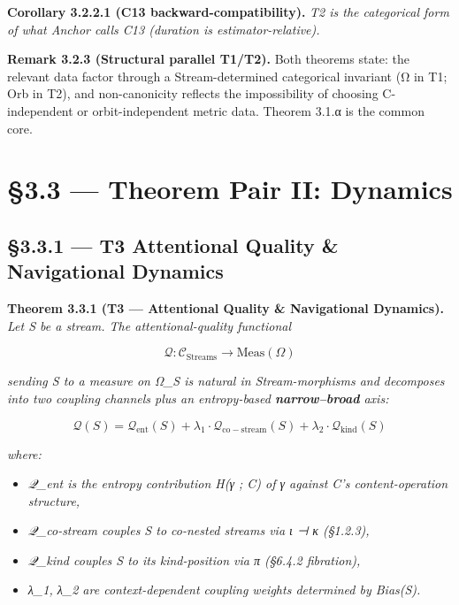 \documentclass[11pt, openany]{book}
\newcommand{\sectionbreak}{\clearpage}
\begin{document}
\textbf{Corollary 3.2.2.1 (C13 backward-compatibility).} \textit{T2 is the categorical form of what Anchor calls C13 (duration is estimator-relative).}

\textbf{Remark 3.2.3 (Structural parallel T1/T2).} Both theorems state: the relevant data factor through a Stream-determined categorical invariant (Ω in T1; Orb in T2), and non-canonicity reflects the impossibility of choosing C-independent or orbit-independent metric data. Theorem 3.1.α is the common core.

\sectionbreak

\section{§3.3 --- Theorem Pair II: Dynamics}

\subsection{§3.3.1 --- T3 Attentional Quality \& Navigational Dynamics}

\textbf{Theorem 3.3.1 (T3 --- Attentional Quality \& Navigational Dynamics).} \textit{Let S be a stream. The attentional-quality functional}

\[
\mathcal{Q} : \mathcal{C}_\mathrm{Streams} \to \mathrm{Meas}(\Omega)
\]

\textit{sending S to a measure on Ω\_\allowbreak{}S is natural in Stream-morphisms and decomposes into two coupling channels plus an entropy-based \textbf{narrow–broad} axis:}

\[
\mathcal{Q}(S) = \mathcal{Q}_\mathrm{ent}(S) + \lambda_1 \cdot \mathcal{Q}_\mathrm{co-stream}(S) + \lambda_2 \cdot \mathcal{Q}_\mathrm{kind}(S)
\]

\textit{where:}
\begin{itemize}
\item \textit{𝒬\_\allowbreak{}ent is the entropy contribution H(γ ; C) of γ against C's content-operation structure,}
\item \textit{𝒬\_\allowbreak{}co-stream couples S to co-nested streams via ι ⊣ κ (§1.2.3),}
\item \textit{𝒬\_\allowbreak{}kind couples S to its kind-position via π (§6.4.2 fibration),}
\item \textit{λ\_\allowbreak{}1, λ\_\allowbreak{}2 are context-dependent coupling weights determined by Bias(S).}
\end{itemize}
\end{document}
